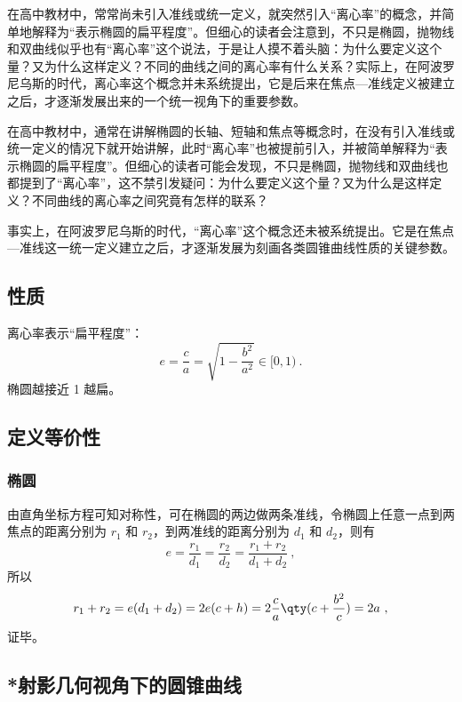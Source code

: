 在高中教材中，常常尚未引入准线或统一定义，就突然引入“离心率”的概念，并简单地解释为“表示椭圆的扁平程度”。但细心的读者会注意到，不只是椭圆，抛物线和双曲线似乎也有“离心率”这个说法，于是让人摸不着头脑：为什么要定义这个量？又为什么这样定义？不同的曲线之间的离心率有什么关系？实际上，在阿波罗尼乌斯的时代，离心率这个概念并未系统提出，它是后来在焦点—准线定义被建立之后，才逐渐发展出来的一个统一视角下的重要参数。

在高中教材中，通常在讲解椭圆的长轴、短轴和焦点等概念时，在没有引入准线或统一定义的情况下就开始讲解，此时“离心率”也被提前引入，并被简单解释为“表示椭圆的扁平程度”。但细心的读者可能会发现，不只是椭圆，抛物线和双曲线也都提到了“离心率”，这不禁引发疑问：为什么要定义这个量？又为什么是这样定义？不同曲线的离心率之间究竟有怎样的联系？

事实上，在阿波罗尼乌斯的时代，“离心率”这个概念还未被系统提出。它是在焦点—准线这一统一定义建立之后，才逐渐发展为刻画各类圆锥曲线性质的关键参数。


\subsection{性质}

离心率表示“扁平程度”：
$$ e = \frac{c}{a} = \sqrt{1 - \frac{b^2}{a^2}} \in [0, 1) ~.$$
椭圆越接近 1 越扁。

\subsection{定义等价性}

\subsubsection{椭圆}

由直角坐标方程可知对称性，可在椭圆的两边做两条准线，令椭圆上任意一点到两焦点的距离分别为 $r_1$ 和 $r_2$，到两准线的距离分别为 $d_1$ 和 $d_2$，则有
\begin{equation}
e = \frac{r_1}{d_1} = \frac{r_2}{d_2} = \frac{r_1 + r_2}{d_1 + d_2}~,
\end{equation}
所以
\begin{equation}
r_1 + r_2 = e(d_1+d_2) = 2e(c + h) = 2\frac{c}{a} \qty( c + \frac{b^2}{c} ) = 2a~,
\end{equation}
证毕。

\subsection{*射影几何视角下的圆锥曲线}

